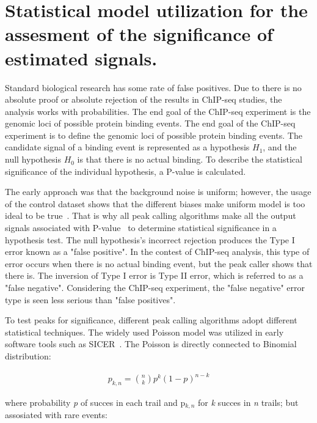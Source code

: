 \section{Statistical model utilization for the assesment of the significance of estimated signals.}


Standard biological research has some rate of false positives. 
Due to there is no absolute proof or absolute rejection of the results in ChIP-seq studies, the analysis works with probabilities.
The end goal of the ChIP-seq experiment is the genomic loci of possible protein binding events. 
The end goal of the ChIP-seq experiment is to define the genomic loci of possible protein binding events. 
The candidate signal of a binding event is represented as a hypothesis $H_{1}$, and the null hypothesis $H_{0}$ is that there is no actual binding. To describe the statistical significance of the individual hypothesis, a P-value is calculated. 

The early approach was that the background noise is uniform; 
however, the usage of the control dataset shows that the different biases make uniform model is too ideal to be true~\cite{robertson2007genome}. 
That is why all peak calling algorithms make all the output signals associated with P-value~\cite{chitpin2019recap} to determine statistical significance in a hypothesis test. 
The null hypothesis's incorrect rejection produces the Type I error known as a "false positive". 
In the contest of ChIP-seq analysis, this type of error occurs when there is no actual binding event, but the peak caller shows that there is. 
The inversion of Type I error is Type II error, which is referred to as a "false negative". Considering the ChIP-seq experiment, the "false negative" error type is seen less serious than "false positives". 

To test peaks for significance, different peak calling algorithms adopt different statistical techniques. 
The widely used Poisson model was utilized in early software tools such as SICER~\cite{zang2009clustering}. 
The Poisson is directly connected to Binomial distribution:

\begin{align*}
    p_{k,n} = \binom{n}{k}p^k(1-p)^{n-k}
\end{align*}

where probability \textit{p} of succes in each trail and p$_{k,n}$  for \textit{k} succes in \textit{n} trails; but assosiated with rare events:

